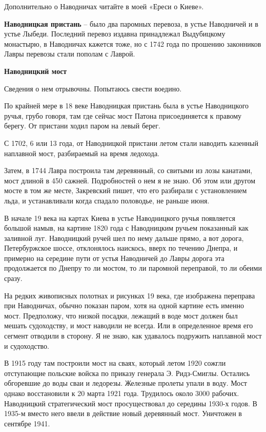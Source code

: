 Дополнительно о Наводничах читайте в моей «Ереси о Киеве».\\

\medskip

\textbf{Наводницкая пристань} – было два паромных перевоза, в устье Наводничей и в устье Лыбеди. Последний перевоз издавна принадлежал Выдубицкому монастырю, в Наводничах кажется тоже, но с 1742 года по прошению законников Лавры перевозы стали пополам с Лаврой.\\

\medskip

\textbf{Наводницкий мост} 

Сведения о нем отрывочны. Попытаюсь свести воедино.

По крайней мере в 18 веке Наводницкая пристань была в устье Наводницкого ручья, грубо говоря, там где сейчас мост Патона присоединяется к правому берегу. От пристани ходил паром на левый берег.

С 1702, 6 или 13 года, от Наводницкой пристани летом стали наводить казенный наплавной мост, разбираемый на время ледохода. 

Затем, в 1744 Лавра построила там деревянный, со свитыми из лозы канатами, мост длиной в 450 сажней. Подробностей о нем я не знаю. Об этом или другом мосте в том же месте, Закревский пишет, что его разбирали с установлением льда, и устанавливали когда спадало половодье, не раньше июня.

В начале 19 века на картах Киева в устье Наводницкого ручья появляется большой намыв, на картине 1820 года с Наводницким ручьем показанный как заливной луг. Наводницкий ручей шел по нему дальше прямо, а вот дорога, Петербуржское шоссе, отклонялось наискось, вверх по течению Днепра, и примерно на середине пути от устья Наводничей до Лавры дорога эта продолжается по Днепру то ли мостом, то ли паромной переправой, то ли обеими сразу.

На редких живописных полотнах и рисунках 19 века, где изображена переправа при Наводничах, обычно показан паром, хотя на одной картине есть именно мост. Предположу, что низкой посадки, лежащий в воде мост должен был мешать судоходству, и мост наводили не всегда. Или в определенное время его сегмент отводили в сторону. Я не знаю, как удавалось подружить наплавной мост и судоходство.

В 1915 году там построили мост на сваях, который летом 1920 сожгли отступающие польские войска по приказу генерала Э. Ридз-Смиглы. Остались обгоревшие до воды сваи и ледорезы. Железные пролеты упали в воду. Мост однако восстановили к 20 марта 1921 года. Трудилось около 3000 рабочих. 
Наводницкий стратегический мост просуществовал до середины 1930-х годов. В 1935-м вместо него ввели в действие новый деревянный мост. Уничтожен в сентябре 1941.\\

